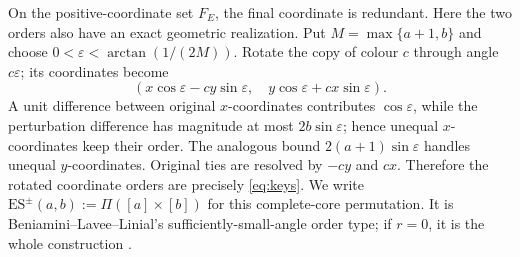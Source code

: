 \documentclass[11pt,letterpaper]{article}
\begin{document}
On the positive-coordinate set $F_E$, the final coordinate is redundant.
Here the two orders also have an exact geometric realization.  Put $M=\max\{a+1,b\}$ and choose
$0<\varepsilon<\arctan(1/(2M))$.  Rotate the copy of
colour $c$ through angle $c\varepsilon$; its coordinates become
\[
 (x\cos\varepsilon-cy\sin\varepsilon,\quad
  y\cos\varepsilon+cx\sin\varepsilon).
\]
A unit difference between original $x$-coordinates contributes
$\cos\varepsilon$, while the perturbation difference has magnitude at
most $2b\sin\varepsilon$; hence unequal $x$-coordinates keep their
order.  The analogous bound $2(a+1)\sin\varepsilon$ handles unequal
$y$-coordinates.  Original ties are resolved by $-cy$ and $cx$.
Therefore the rotated coordinate orders are precisely
\eqref{eq:keys}.  We write
$\mathrm{ES}^{\pm}(a,b):=\Pi([a]\times[b])$ for this complete-core
permutation.  It is Beniamini--Lavee--Linial's sufficiently-small-angle order
type; if $r=0$, it is the whole construction \cite[Definition~5.6]{BLL}.
\end{document}
